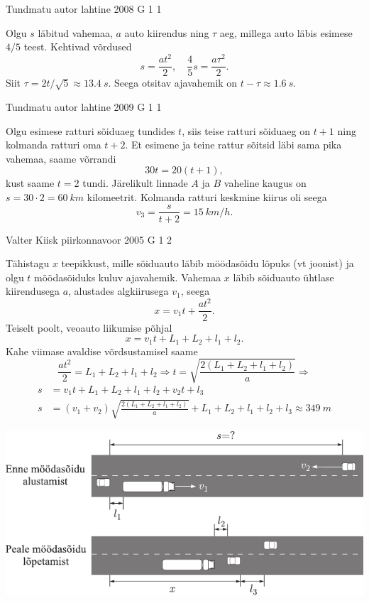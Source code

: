 \documentclass[11pt]{article}
\begin{document}
{%
{Tundmatu autor} %
{lahtine} %
{2008} %
{G 1} %
{1} %
{

\ifSolution
Olgu $s$ läbitud vahemaa, $a$ auto kiirendus ning $\tau$ aeg, millega auto läbis esimese $4/5$ teest. Kehtivad võrdused
\[
s=\frac{a t^{2}}{2}, \quad \frac{4}{5} s=\frac{a \tau^{2}}{2}.
\]
Siit $\tau = 2t/\sqrt 5\approx \SI{13,4}{s}$. Seega otsitav ajavahemik on $t-\tau\approx \SI{1,6}{s}$.
\fi
}

{Tundmatu autor} %
{lahtine} %
{2009} %
{G 1} %
{1} %
{

\ifSolution
Olgu esimese ratturi sõiduaeg tundides $t$, siis teise ratturi sõiduaeg on $t + 1$ ning kolmanda ratturi oma $t+2$. Et esimene ja teine rattur sõitsid läbi sama pika vahemaa, saame võrrandi
\[
30 t=20(t+1),
\]
kust saame $t = \num{2}$ tundi. Järelikult linnade $A$ ja $B$ vaheline kaugus on $s = \num{30}·\num{2} = \SI{60}{km}$ kilomeetrit. Kolmanda ratturi keskmine kiirus oli seega
\[
v_{3}=\frac{s}{t+2}=\SI{15}{km/h}.
\]
\fi
}

{Valter Kiisk} %
{piirkonnavoor} %
{2005} %
{G 1} %
{2} %
{

\ifSolution
Tähistagu $x$ teepikkust, mille sõiduauto läbib möödasõidu lõpuks (vt joonist) ja olgu $t$ möödasõiduks kuluv ajavahemik. Vahemaa $x$ läbib sõiduauto ühtlase kiirendusega $a$, alustades algkiirusega $v_1$, seega
\[
x = v_1t + \frac{at^2}{2}. 
\]
Teiselt poolt, veoauto liikumise põhjal
\[
x = v_1t + L_1 + L_2 + l_1 + l_2.
\]
Kahe viimase avaldise võrdsustamisel saame
\[
\frac{a t^{2}}{2}=L_{1}+L_{2}+l_{1}+l_{2} \Rightarrow t=\sqrt{\frac{2\left(L_{1}+L_{2}+l_{1}+l_{2}\right)}{a}}\Rightarrow
\]
\[
\begin{aligned}
s &= v_1t + L_1 + L_2 + l_1 + l_2 + v_2t + l_3\\
s &= \left(v_{1}+v_{2}\right) \sqrt{\frac{2\left(L_{1}+L_{2}+l_{1}+l_{2}\right)}{a}}+L_{1}+L_{2}+l_{1}+l_{2}+l_{3} \approx \SI{349}{m}
\end{aligned}
\]

\begin{center}
	\includegraphics[width=\linewidth]{2005-v2g-01-lah}
\end{center}

}}
\end{document}
